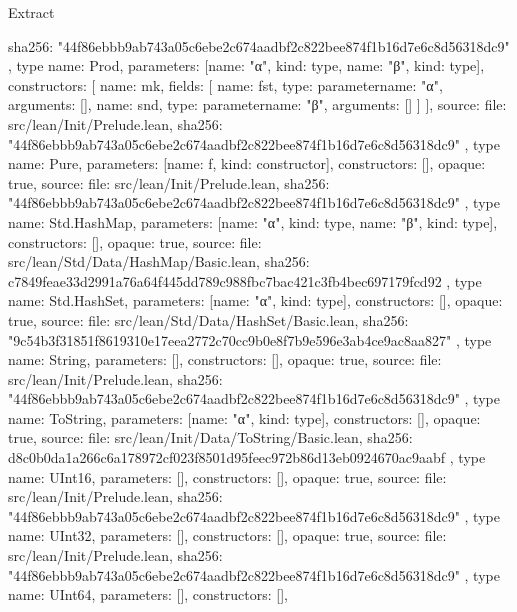 \begin{lexlean}{Extract}
\begin{toolingmodule}
{{{        sha256: "44f86ebbb9ab743a05c6ebe2c674aadbf2c822bee874f1b16d7e6c8d56318dc9"
      }
    },
    type{
      name: Prod,
      parameters: [{name: "α", kind: type{}}, {name: "β", kind: type{}}],
      constructors: [
        {
          name: mk,
          fields: [
            {name: fst, type: parameter{name: "α", arguments: []}},
            {name: snd, type: parameter{name: "β", arguments: []}}
          ]
        }
      ],
      source: {
        file: src/lean/Init/Prelude.lean,
        sha256: "44f86ebbb9ab743a05c6ebe2c674aadbf2c822bee874f1b16d7e6c8d56318dc9"
      }
    },
    type{
      name: Pure,
      parameters: [{name: f, kind: constructor{}}],
      constructors: [],
      opaque: true,
      source: {
        file: src/lean/Init/Prelude.lean,
        sha256: "44f86ebbb9ab743a05c6ebe2c674aadbf2c822bee874f1b16d7e6c8d56318dc9"
      }
    },
    type{
      name: Std.HashMap,
      parameters: [{name: "α", kind: type{}}, {name: "β", kind: type{}}],
      constructors: [],
      opaque: true,
      source: {
        file: src/lean/Std/Data/HashMap/Basic.lean,
        sha256: c7849feae33d2991a76a64f445dd789c988fbc7bac421c3fb4bec697179fcd92
      }
    },
    type{
      name: Std.HashSet,
      parameters: [{name: "α", kind: type{}}],
      constructors: [],
      opaque: true,
      source: {
        file: src/lean/Std/Data/HashSet/Basic.lean,
        sha256: "9c54b3f31851f8619310e17eea2772c70cc9b0e8f7b9e596e3ab4ce9ac8aa827"
      }
    },
    type{
      name: String,
      parameters: [],
      constructors: [],
      opaque: true,
      source: {
        file: src/lean/Init/Prelude.lean,
        sha256: "44f86ebbb9ab743a05c6ebe2c674aadbf2c822bee874f1b16d7e6c8d56318dc9"
      }
    },
    type{
      name: ToString,
      parameters: [{name: "α", kind: type{}}],
      constructors: [],
      opaque: true,
      source: {
        file: src/lean/Init/Data/ToString/Basic.lean,
        sha256: d8c0b0da1a266c6a178972cf023f8501d95feec972b86d13eb0924670ac9aabf
      }
    },
    type{
      name: UInt16,
      parameters: [],
      constructors: [],
      opaque: true,
      source: {
        file: src/lean/Init/Prelude.lean,
        sha256: "44f86ebbb9ab743a05c6ebe2c674aadbf2c822bee874f1b16d7e6c8d56318dc9"
      }
    },
    type{
      name: UInt32,
      parameters: [],
      constructors: [],
      opaque: true,
      source: {
        file: src/lean/Init/Prelude.lean,
        sha256: "44f86ebbb9ab743a05c6ebe2c674aadbf2c822bee874f1b16d7e6c8d56318dc9"
      }
    },
    type{
      name: UInt64,
      parameters: [],
      constructors: [],
}}
\end{toolingmodule}
\end{lexlean}

